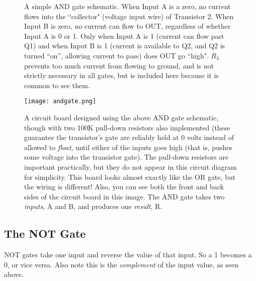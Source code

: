\bigskip

\begin{figure}[h!]
\begin{center}


\caption{A simple AND gate schematic. When Input A is a zero, no current flows into the ``collector" (voltage input wire) of Transistor 2. When Input B is zero, no current can flow to OUT, regardless of whether Input A is 0 or 1. Only when Input A is 1 (current can flow past Q1) and when Input B is 1 (current is available to Q2, and Q2 is turned ``on'', allowing current to pass) does OUT go ``high". $R_3$ prevents too much current from flowing to ground, and is not strictly necessary in all gates, but is included here because it is common to see them.}
\label{fig:simpleandgate}
\end{center}
\end{figure}



\begin{figure}[h!]
\begin{center}
\texttt{[image: andgate.png]}
\caption{A circuit board designed using the above AND gate schematic, though with two 100K pull-down resistors also implemented (these guarantee the transistor's gate are reliably held at 0 volts instead of allowed to \emph{float}, until either of the inputs goes high (that is, pushes some voltage into the transistor gate). The pull-down resistors are important practically, but they do not appear in this circuit diagram for simplicity. This board looks almost exactly like the OR gate, but the wiring is different! Also, you can see both the front and back sides of the circuit board in this image. The AND gate takes two \emph{inputs}, A and B, and produces one \emph{result}, R.}
\end{center}
\label{fig:andgate}
\end{figure}


\clearpage
\newpage

\subsection*{The NOT Gate}

NOT gates take one input and reverse the value of that input. So a 1 becomes a 0, or vice versa. Also note this is the \emph{complement} of the input value, as seen above.

